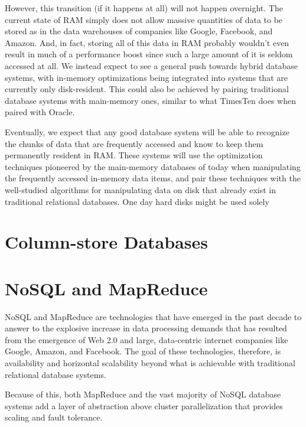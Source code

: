 \documentclass[11pt,a4paper]{report}
\begin{document}
However, this transition (if it happens at all) will not happen overnight. The current state of RAM simply does not allow massive quantities of data to be stored as in the data warehouses of companies like Google, Facebook, and Amazon. And, in fact, storing all of this data in RAM probably wouldn't even result in much of a performance boost since such a large amount of it is seldom accessed at all. We instead expect to see a general push towards hybrid database systems, with in-memory optimizations being integrated into systems that are currently only disk-resident. This could also be achieved by pairing traditional database systems with main-memory ones, similar to what TimesTen does when paired with Oracle. 

Eventually, we expect that any good database system will be able to recognize the chunks of data that are frequently accessed and know to keep them permanently resident in RAM. These systems will use the optimization techniques pioneered by the main-memory databases of today when manipulating the frequently accessed in-memory data items, and pair these techniques with the well-studied algorithms for manipulating data on disk that already exist in traditional relational databases. One day hard disks might be used solely 


\chapter{Column-store Databases}





\chapter{NoSQL and MapReduce}
NoSQL and MapReduce are technologies that have emerged in the past decade to answer to the explosive increase in data processing demands that has resulted from the emergence of Web 2.0 and large, data-centric internet companies like Google, Amazon, and Facebook.\cite{leavitt2010will} The goal of these technologies, therefore, is availability and horizontal scalability beyond what is achievable with traditional relational database systems.

Because of this, both MapReduce and the vast majority of NoSQL database systems add a layer of abstraction above cluster parallelization that provides scaling and fault tolerance.
\end{document}
